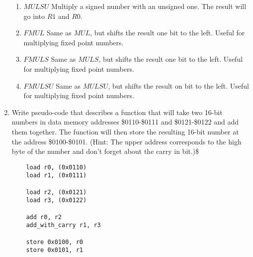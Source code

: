 \documentclass[12pt,letterpaper]{article}
\begin{document}
\begin{enumerate}
\begin{enumerate}
    \item $MULSU$ Multiply a signed number with an unsigned one. The result will go into $R1$ and $R0$.\\
    \item $FMUL$ Same as $MUL$, but shifts the result one bit to the left. Useful for multiplying fixed point numbers.\\
    \item $FMULS$ Same as $MULS$, but shifts the result one bit to the left. Useful for multiplying fixed point numbers.\\
    \item $FMULSU$ Same as $MULSU$, but shifts the result on bit to the left. Useful for multiplying fixed point numbers.\\
\end{enumerate}


    \item Write pseudo-code that describes a function that will take two 16-bit numbers in data memory addresses \$0110-\$0111 and \$0121-\$0122 and add them together. The function will then store the resulting 16-bit number at the address \$0100-\$0101. (Hint: The upper address corresponds to the high byte of the number and don’t forget about the carry in bit.)\$
  \begin{verbatim}
    load r0, (0x0110)
    load r1, (0x0111)

    load r2, (0x0121)
    load r3, (0x0122)

    add r0, r2
    add_with_carry r1, r3

    store 0x0100, r0
    store 0x0101, r1
  \end{verbatim}
\end{enumerate}
\end{document}
